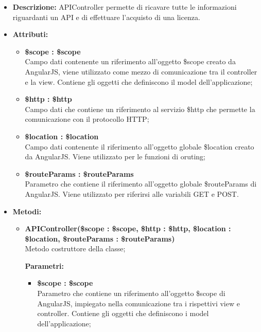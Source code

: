 \begin{itemize}
	\item \textbf{Descrizione:} APIController permette di ricavare tutte le informazioni riguardanti un API e di effettuare l'acquisto di una licenza.
	\item \textbf{Attributi:}
	\begin{itemize}
		
		\item \textbf{\$scope : \$scope}\\
		Campo dati contenente un riferimento all'oggetto \$scope creato da AngularJS, viene utilizzato come mezzo di comunicazione tra il controller e la view. Contiene gli oggetti che definiscono il model dell'applicazione;
		
		\item \textbf{\$http : \$http }\\
		Campo dati che contiene un riferimento al servizio \$http che permette la comunicazione con il protocollo HTTP;
		
		\item \textbf{\$location : \$location }\\
		Campo dati contenente il riferimento all'oggetto globale \$location creato da AngularJS. Viene utilizzato per le funzioni di oruting;
		
		\item \textbf{\$routeParams : \$routeParams}\\
		Parametro che contiene il riferimento all'oggetto globale \$routeParams di AngularJS. Viene utilizzato per riferirsi alle variabili GET e POST.
		
		
	\end{itemize}
	\item \textbf{Metodi:}
	\begin{itemize}
		
		\item \textbf{APIController(\$scope : \$scope, \$http : \$http, \$location : \$location, \$routeParams : \$routeParams)}\\
		Metodo costruttore della classe;
		\begin{description}
			\item[\textbf{Parametri:}]
		\end{description}
		\begin{itemize}
			\item \textbf{\$scope : \$scope}\\
			Parametro che contiene un riferimento all'oggetto \$scope di AngularJS, impiegato nella comunicazione tra i rispettivi view e controller. Contiene gli oggetti che definiscono i model dell'applicazione;
			

\end{itemize}
\end{itemize}
\end{itemize}
